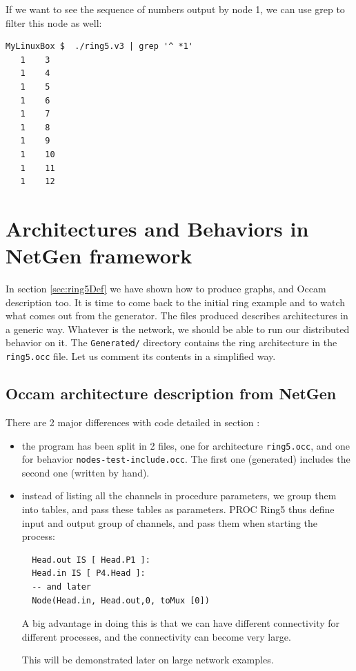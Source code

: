 \documentclass[times,a4paper]{book}
\begin{document}
If we want to see the sequence of numbers output by node 1,
we can use grep to filter this node as well:

\begin{lstlisting} 
MyLinuxBox $  ./ring5.v3 | grep '^ *1' 
   1    3
   1    4
   1    5
   1    6
   1    7
   1    8
   1    9
   1    10
   1    11
   1    12
\end{lstlisting} 

\section{Architectures and Behaviors in NetGen framework}

In section \ref{sec:ring5Def} we have shown how to produce graphs, and Occam
description too. It is time to come back to the initial ring example and to watch what 
comes out from the generator. The files produced describes architectures in a generic
way. Whatever is the network, we should be able to run our distributed behavior on it.
The {\tt Generated/} directory contains the ring architecture in the {\tt ring5.occ} file.
Let us comment its contents in a simplified way.

\subsection{Occam architecture description from NetGen}

There are 2 major differences with code detailed  in section \label{sec:ringArchiv3}:
\begin{itemize}
\item the program has been split in 2 files, one for architecture {\tt ring5.occ}, and one
for behavior  {\tt nodes-test-include.occ}. The first one (generated) includes the second one
(written by hand).
\item instead of listing all the channels in procedure parameters, we group them into
tables, and pass these tables as parameters. PROC Ring5 thus define input and output
group of channels, and pass them when starting the process:

\begin{lstlisting} 
  Head.out IS [ Head.P1 ]:
  Head.in IS [ P4.Head ]:
  -- and later
  Node(Head.in, Head.out,0, toMux [0])
\end{lstlisting} 

A big advantage in doing this is that we can have different connectivity
for different processes, and the connectivity can become very large.

This will be demonstrated later on large network examples.
\end{itemize}
\end{document}
